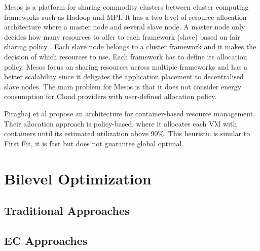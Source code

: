 Mesos \cite{Hindman:2011ux} is a platform for sharing commodity clusters between cluster computing frameworks such as Hadoop and MPI. It has a two-level of resource allocation architecture where a master node and several slave node. A master node only decides how many resources to offer to each framework (slave) based on fair sharing policy \cite{Ghodsi:2011vm}. Each slave node belongs to a cluster framework and it makes the decision of which resources to use. Each framework has to define its allocation policy. Mesos focus on sharing resources across multiple frameworks and has a better scalability since it deligates the application placement to decentralised slave nodes. The main problem for Mesos is that it does not consider energy consumption for Cloud providers with user-defined allocation policy.

Piraghaj et al \cite{Piraghaj:2016bw} propose an architecture for container-based resource management. Their allocation approach is policy-based, where it allocates each VM with containers until its estimated utilization above 90\%. This heuristic is similar to First Fit, it is fast but does not guarantee global optimal.

\section{Bilevel Optimization}
\subsection{Traditional Approaches}
\subsection{EC Approaches}



